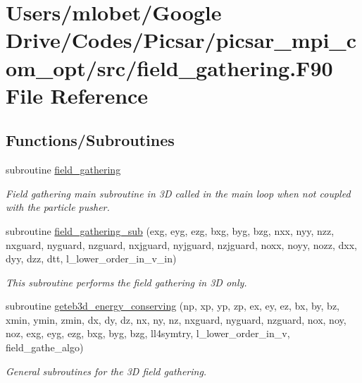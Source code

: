 \hypertarget{field__gathering_8_f90}{}\section{Users/mlobet/\+Google Drive/\+Codes/\+Picsar/picsar\+\_\+mpi\+\_\+com\+\_\+opt/src/field\+\_\+gathering.F90 File Reference}
\label{field__gathering_8_f90}
\subsection*{Functions/\+Subroutines}
\begin{DoxyCompactItemize}
\item 
subroutine \hyperlink{field__gathering_8_f90_a967586c463fd968e31a929a61e6e2b65}{field\+\_\+gathering}
\begin{DoxyCompactList}\small\item\em Field gathering main subroutine in 3D called in the main loop when not coupled with the particle pusher. \end{DoxyCompactList}\item 
subroutine \hyperlink{field__gathering_8_f90_a331d1bcb6c50afc68081f4c9842d2aea}{field\+\_\+gathering\+\_\+sub} (exg, eyg, ezg, bxg, byg, bzg, nxx, nyy, nzz,                   nxguard, nyguard, nzguard, nxjguard, nyjguard, nzjguard, noxx, noyy, nozz,               dxx, dyy, dzz, dtt, l\+\_\+lower\+\_\+order\+\_\+in\+\_\+v\+\_\+in)
\begin{DoxyCompactList}\small\item\em This subroutine performs the field gathering in 3D only. \end{DoxyCompactList}\item 
subroutine \hyperlink{field__gathering_8_f90_a02f8f275e2b38a13c4de92719714b016}{geteb3d\+\_\+energy\+\_\+conserving} (np, xp, yp, zp, ex, ey, ez, bx, by, bz, xmin, ymin, zmin, dx, dy, dz, nx, ny, nz, nxguard, nyguard, nzguard,                                                                                                                                                       nox, noy, noz, exg, eyg, ezg, bxg, byg, bzg, ll4symtry, l\+\_\+lower\+\_\+order\+\_\+in\+\_\+v, field\+\_\+gathe\+\_\+algo)
\begin{DoxyCompactList}\small\item\em General subroutines for the 3D field gathering. \end{DoxyCompactList}\item 

\end{DoxyCompactItemize}
